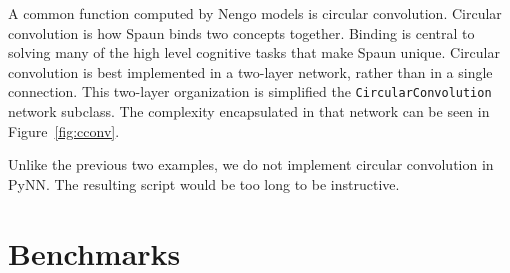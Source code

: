 \documentclass{frontiersSCNS}
\begin{document}
A common function computed by Nengo models
is circular convolution.
Circular convolution is how
Spaun binds two concepts together.
Binding is central to solving many
of the high level cognitive tasks
that make Spaun unique.
Circular convolution
is best implemented in a two-layer network,
rather than in a single connection.
This two-layer organization is simplified
the \texttt{CircularConvolution} network subclass.
The complexity encapsulated in that network
can be seen in Figure~\ref{fig:cconv}.

Unlike the previous two examples,
we do not implement
circular convolution in PyNN.
The resulting script would be
too long to be instructive.

\section{Benchmarks} \label{sec:benchmark}
\end{document}
